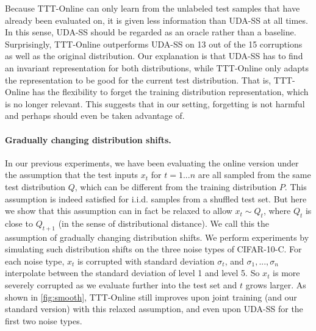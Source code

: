 \documentclass{article}
\theoremstyle{plain}
\theoremstyle{remark}
\theoremstyle{definition}
\begin{document}
Because TTT-Online can only learn from the unlabeled test samples that have already been evaluated on, it is given less information than UDA-SS at all times. In this sense, UDA-SS should be regarded as an oracle rather than a baseline.
Surprisingly, TTT-Online outperforms UDA-SS on 13 out of the 15 corruptions as well as the original distribution.
Our explanation is that UDA-SS has to find an invariant representation for both distributions, while TTT-Online only adapts the representation to be good for the current test distribution. That is, TTT-Online has the flexibility to  forget the training distribution representation, which is no longer relevant. This suggests that in our setting, forgetting is not harmful and perhaps should even be taken advantage of.

\paragraph{Gradually changing distribution shifts.}
In our previous experiments, we have been evaluating the online version under the assumption that the test inputs $x_t$ for $t=1...n$ are all sampled from the same test distribution $Q$, which can be different from the training distribution $P$. 
This assumption is indeed satisfied for i.i.d. samples from a shuffled test set.
But here we show that this assumption can in fact be relaxed to allow $x_t\sim Q_t$, where $Q_t$ is close to $Q_{t+1}$ (in the sense of distributional distance).
We call this the assumption of gradually changing distribution shifts. We perform experiments by simulating such distribution shifts on the three noise types of CIFAR-10-C. For each noise type, $x_t$ is corrupted with standard deviation $\sigma_t$, and $\sigma_1,...,\sigma_n$ interpolate between the standard deviation of level 1 and level 5. So $x_t$ is more severely corrupted as we evaluate further into the test set and $t$ grows larger.
As shown in \autoref{fig:smooth}, 
TTT-Online still improves upon joint training (and our standard version) with this relaxed assumption, and even upon UDA-SS for the first two noise types.
\end{document}
